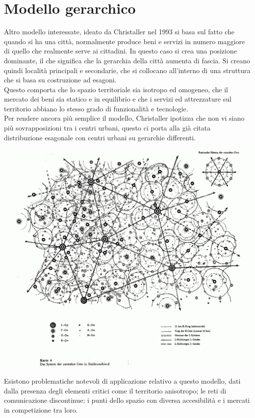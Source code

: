\documentclass[a4paper,12pt, oneside]{book}
\begin{document}
  \section{Modello gerarchico}
  Altro modello interessate, ideato da Christaller nel 1993 si basa sul fatto che quando si ha una città, normalmente produce beni e servizi in numero maggiore di quello che realmente serve ai cittadini. In questo caso si crea una posizione dominante, il che significa che la gerarchia della città aumenta di fascia. Si creano quindi località principali e secondarie, che si collocano all'interno di una struttura che si basa su costruzione ad esagoni.\\
  Questo comporta che lo spazio territoriale sia isotropo ed omogeneo, che il mercato dei beni sia statico e in equilibrio e che i servizi ed attrezzature sul territorio abbiano lo stesso grado di funzionalità e tecnologie.\\
  Per rendere ancora più semplice il modello, Christaller ipotizza che non vi siano più sovrapposizioni tra i centri urbani, questo ci porta alla già citata distribuzione esagonale con centri urbani su gerarchie differenti.\\
  \begin{center}
  	\includegraphics[width=0.6\linewidth]{"immagini/Christaller modello a esagono"}
  	\label{fig:Christaller modello a esagono}
  \end{center}
Esistono problematiche notevoli di applicazione relativo a questo modello, dati dalla presenza degli elementi critici come il territorio anisotropo; le reti di comunicazione discontinue; i punti dello spazio con diversa accesibilità e i mercati in competizione tra loro.\\
\end{document}
